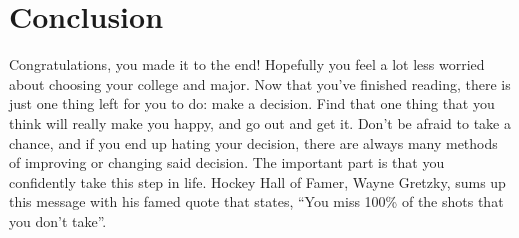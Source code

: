 \chapter{Conclusion}

	Congratulations, you made it to the end! Hopefully you feel a lot less worried about choosing your college and major. Now that you’ve finished reading, there is just one thing left for you to do: make a decision. Find that one thing that you think will really make you happy, and go out and get it. Don’t be afraid to take a chance, and if you end up hating your decision, there are always many methods of improving or changing said decision. The important part is that you confidently take this step in life. Hockey Hall of Famer, Wayne Gretzky, sums up this message with his famed quote that states, “You miss 100\% of the shots that you don’t take”.
